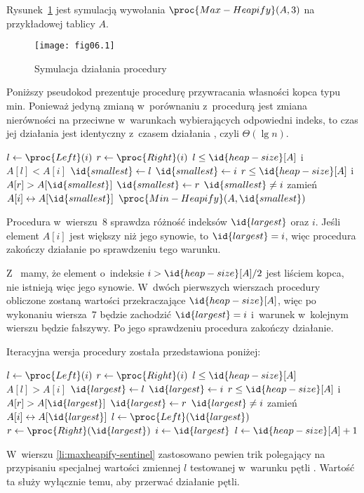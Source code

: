 
\exercise %
Rysunek~\ref{fig:6.2-1} jest symulacją wywołania $\proc{Max-Heapify}(A,3)$ na przykładowej tablicy $A$.
\begin{figure}[ht]
	\begin{center}
		\texttt{[image: fig06.1]}
	\end{center}
	\caption{Symulacja działania procedury } \label{fig:6.2-1}
\end{figure}

\exercise %
Poniższy pseudokod prezentuje procedurę przywracania własności kopca typu min. Ponieważ jedyną zmianą w~porównaniu z~procedurą  jest zmiana nierówności na przeciwne w~warunkach wybierających odpowiedni indeks, to czas jej działania jest identyczny z~czasem działania , czyli $\Theta(\lg n)$.
\begin{codebox}
\li	$l\gets\proc{Left}(i)$
\li	$r\gets\proc{Right}(i)$
\li	\If $l\le\id{heap-size}[A]$ i~$A[l]<A[i]$
\li		\Then $\id{smallest}\gets l$
\li		\Else $\id{smallest}\gets i$
		\End
\li	\If $r\le\id{heap-size}[A]$ i~$A[r]>A[\id{smallest}]$
\li		\Then $\id{smallest}\gets r$
		\End
\li	\If $\id{smallest}\ne i$
\li		\Then
			zamień $A[i]\leftrightarrow A[\id{smallest}]$
\li			$\proc{Min-Heapify}(A,\id{smallest})$
		\End
\end{codebox}

\exercise %
Procedura w~wierszu~8 sprawdza różność indeksów $\id{largest}$ oraz $i$. Jeśli element $A[i]$ jest większy niż jego synowie, to $\id{largest}=i$, więc procedura zakończy działanie po sprawdzeniu tego warunku.

\exercise %
Z~ mamy, że element o~indeksie $i>\id{heap-size}[A]/2$ jest liściem kopca, nie istnieją więc jego synowie. W~dwóch pierwszych wierszach procedury  obliczone zostaną wartości przekraczające $\id{heap-size}[A]$, więc po wykonaniu wiersza~7 będzie zachodzić $\id{largest}=i$ i~warunek w~kolejnym wierszu będzie fałszywy. Po jego sprawdzeniu procedura zakończy działanie.

\exercise %
Iteracyjna wersja procedury  została przedstawiona poniżej:
\begin{codebox}
\li	$l\gets\proc{Left}(i)$
\li	$r\gets\proc{Right}(i)$
\li	\While $l\le\id{heap-size}[A]$
\li		\Do
			\If $A[l]>A[i]$
\li				\Then $\id{largest}\gets l$
\li				\Else $\id{largest}\gets i$
				\End
\li			\If $r\le\id{heap-size}[A]$ i~$A[r]>A[\id{largest}]$
\li				\Then $\id{largest}\gets r$
				\End
\li			\If $\id{largest}\ne i$
\li				\Then
					zamień $A[i]\leftrightarrow A[\id{largest}]$
\li					$l\gets\proc{Left}(\id{largest})$
\li					$r\gets\proc{Right}(\id{largest})$
\li					$i\gets\id{largest}$
\li				\Else $l\gets\id{heap-size}[A]+1$ \label{li:maxheapify-sentinel}
				\End
		\End
\end{codebox}
W~wierszu \ref{li:maxheapify-sentinel} zastosowano pewien trik polegający na przypisaniu specjalnej wartości zmiennej $l$ testowanej w~warunku pętli . Wartość ta służy wyłącznie temu, aby przerwać działanie pętli.

